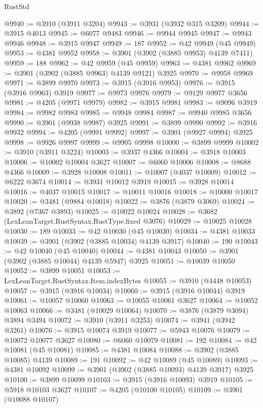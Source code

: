 \begin{lexlean}{RustStd}
\begin{coremodule}
@9940 := @3910 (@3911 @3204)
@9943 := @3931 (@3932 @315 @3209)
@9944 := @3915 @4013
@9945 := @6077 @9483
@9946 := @9944 @9945
@9947 := @9943 @9946
@9948 := @3915 @9947
@9949 := 187
@9952 := @42 @9949 (@45 @9949)
@9953 := @4381 @9952
@9958 := @3901 (@3902 (@3885 @9953) @4139 @7411)
@9959 := 188
@9962 := @42 @9959 (@45 @9959)
@9963 := @4381 @9962
@9969 := @3901 (@3902 (@3885 @9963) @4139 @9121) @3925
@9970 := @9958 @9969
@9971 := @3899 @9970
@9973 := @3915 (@3916 @9953)
@9976 := @3915 (@3916 @9963) @3919
@9977 := @9973 @9976
@9979 := @9129 @9977 @3656
@9981 := @4205 (@9971 @9979)
@9982 := @3915 @9981
@9983 := @9096 @3919
@9984 := @9982 @9983
@9985 := @9948 @9984
@9987 := @9940 @9985 @3656
@9990 := @3901 (@9938 @9987) @3925
@9991 := @3899 @9990
@9992 := @3916 @9932
@9994 := @4205 (@9991 @9992)
@9997 := @3901 (@9927 @9994) @3925
@9998 := @9926 @9997
@9999 := @9905 @9998
@10000 := @3899 @9999
@10002 := @3910 (@3911 @3224)
@10003 := @3937 @4366
@10004 := @3918 @10003
@10006 := @10002 @10004 @3627
@10007 := @6060 @10006
@10008 := @8688 @4366
@10009 := @3928 @10008
@10011 := @10007 (@4037 @10009)
@10012 := @6222 @3674
@10014 := @3931 @10012 @3919
@10015 := @3928 @10014
@10016 := @4037 @10015
@10017 := @10011 @10016
@10018 := @10000 @10017
@10020 := @3481 (@9884 @10018)
@10022 := @3876 (@3879 @3069)
@10024 := @3892 (@7367 @3893)
@10025 := @10022 @10024
@10028 := @3682 (LexLeanTarget.RustSyntax.RustType.fixed @3076)
@10029 := @10025 @10028
@10030 := 189
@10033 := @42 @10030 (@45 @10030)
@10034 := @4381 @10033
@10039 := @3901 (@3902 (@3885 @10034) @4139 @3917)
@10040 := 190
@10043 := @42 @10040 (@45 @10040)
@10044 := @4381 @10043
@10050 := @3901 (@3902 (@3885 @10044) @4139 @5947) @3925
@10051 := @10039 @10050
@10052 := @3899 @10051
@10053 := LexLeanTarget.RustSyntax.Item.indexBytes
@10055 := @3910 (@4448 @10053)
@10057 := @3915 (@3916 @10034)
@10060 := @3915 (@3916 @10044) @3919
@10061 := @10057 @10060
@10063 := @10055 @10061 @3627
@10064 := @10052 @10063
@10066 := @3481 (@10029 @10064)
@10070 := @3876 (@3879 @3094) @3894 @3494
@10072 := @3910 (@3911 @3253)
@10074 := @3941 (@3942 @3261)
@10076 := @3915 @10074 @3919
@10077 := @5943 @10076
@10079 := @10072 @10077 @3627
@10080 := @6060 @10079
@10081 := 192
@10084 := @42 @10081 (@45 @10081)
@10085 := @4381 @10084
@10088 := @3902 (@3885 @10085) @4139
@10089 := 191
@10092 := @42 @10089 (@45 @10089)
@10093 := @4381 @10092
@10099 := @3901 (@3902 (@3885 @10093) @4139 @3917) @3925
@10100 := @3899 @10099
@10103 := @3915 (@3916 @10093) @3919
@10105 := @5918 @10103 @3627
@10107 := @4205 (@10100 @10105)
@10109 := @3901 (@10088 @10107)

\end{coremodule}
\end{lexlean}
